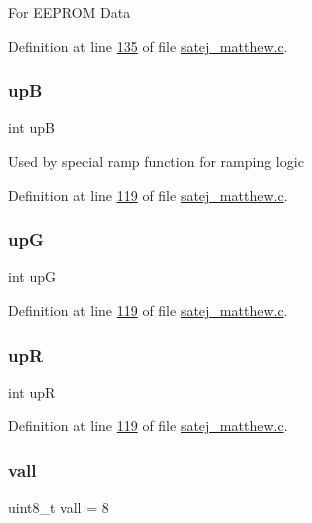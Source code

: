 For E\+E\+P\+R\+OM Data 

Definition at line \mbox{\hyperlink{satej__matthew_8c_source_l00135}{135}} of file \mbox{\hyperlink{satej__matthew_8c_source}{satej\+\_\+matthew.\+c}}.

\mbox{\label{satej__matthew_8c_a106fbf734fbb9c192880e1cd12f4a396}} 
\subsubsection{\texorpdfstring{upB}{upB}}
{\footnotesize\ttfamily int upB}

Used by special ramp function for ramping logic 

Definition at line \mbox{\hyperlink{satej__matthew_8c_source_l00119}{119}} of file \mbox{\hyperlink{satej__matthew_8c_source}{satej\+\_\+matthew.\+c}}.

\mbox{\label{satej__matthew_8c_a5fd7e7401aceed949131c42599336c36}} 
\subsubsection{\texorpdfstring{upG}{upG}}
{\footnotesize\ttfamily int upG}



Definition at line \mbox{\hyperlink{satej__matthew_8c_source_l00119}{119}} of file \mbox{\hyperlink{satej__matthew_8c_source}{satej\+\_\+matthew.\+c}}.

\mbox{\label{satej__matthew_8c_aa676cd48f328c4eb0b19b54828466beb}} 
\subsubsection{\texorpdfstring{upR}{upR}}
{\footnotesize\ttfamily int upR}



Definition at line \mbox{\hyperlink{satej__matthew_8c_source_l00119}{119}} of file \mbox{\hyperlink{satej__matthew_8c_source}{satej\+\_\+matthew.\+c}}.

\mbox{\label{satej__matthew_8c_a426799fe4a09815b45a213ed9f277065}} 
\subsubsection{\texorpdfstring{vall}{vall}}
{\footnotesize\ttfamily uint8\+\_\+t vall = 8}

